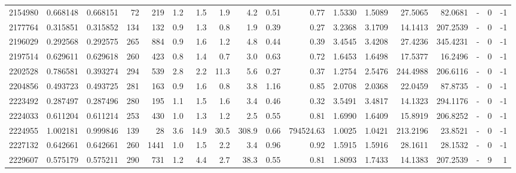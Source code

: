 \begin{tabular}{rrrrrrrrrrrrrrrlrr}
   2154980 & 0.668148 &   0.668151 &   72 &  219 &      1.2 &      1.5 &     1.9 &      4.2 &       0.51 &        0.77 &  1.5330 &  1.5089 &   27.5065 &   82.0681 &             - &        0 &         -1 \\
   2177764 & 0.315851 &   0.315852 &  134 &  132 &      0.9 &      1.3 &     0.8 &      1.9 &       0.39 &        0.27 &  3.2368 &  3.1709 &   14.1413 &  207.2539 &             - &        0 &         -1 \\
   2196029 & 0.292568 &   0.292575 &  265 &  884 &      0.9 &      1.6 &     1.2 &      4.8 &       0.44 &        0.39 &  3.4545 &  3.4208 &   27.4236 &  345.4231 &             - &        0 &         -1 \\
   2197514 & 0.629611 &   0.629618 &  260 &  423 &      0.8 &      1.4 &     0.7 &      3.0 &       0.63 &        0.72 &  1.6453 &  1.6498 &   17.5377 &   16.2496 &             - &        0 &         -1 \\
   2202528 & 0.786581 &   0.393274 &  294 &  539 &      2.8 &      2.2 &    11.3 &      5.6 &       0.27 &        0.37 &  1.2754 &  2.5476 &  244.4988 &  206.6116 &             - &        0 &         -1 \\
   2204856 & 0.493723 &   0.493725 &  281 &  163 &      0.9 &      1.6 &     0.8 &      3.8 &       1.16 &        0.85 &  2.0708 &  2.0368 &   22.0459 &   87.8735 &             - &        0 &         -1 \\
   2223492 & 0.287497 &   0.287496 &  280 &  195 &      1.1 &      1.5 &     1.6 &      3.4 &       0.46 &        0.32 &  3.5491 &  3.4817 &   14.1323 &  294.1176 &             - &        0 &         -1 \\
   2224033 & 0.611204 &   0.611214 &  253 &  430 &      1.0 &      1.3 &     1.2 &      2.5 &       0.55 &        0.81 &  1.6990 &  1.6409 &   15.8919 &  206.8252 &             - &        0 &         -1 \\
   2224955 & 1.002181 &   0.999846 &  139 &   28 &      3.6 &     14.9 &    30.5 &    308.9 &       0.66 &   794524.63 &  1.0025 &  1.0421 &  213.2196 &   23.8521 &             - &        0 &         -1 \\
   2227132 & 0.642661 &   0.642661 &  260 & 1441 &      1.0 &      1.5 &     2.2 &      3.4 &       0.96 &        0.92 &  1.5915 &  1.5916 &   28.1611 &   28.1532 &             - &        0 &         -1 \\
   2229607 & 0.575179 &   0.575211 &  290 &  731 &      1.2 &      4.4 &     2.7 &     38.3 &       0.55 &        0.81 &  1.8093 &  1.7433 &   14.1383 &  207.2539 &             - &        9 &          1 \\

\end{tabular}
